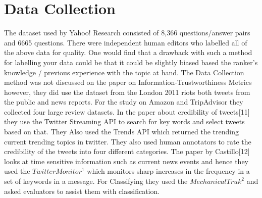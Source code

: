 \section{Data Collection}
The dataset used by Yahoo! Research consisted of 8,366 questions/answer pairs and 6665 questions. There were independent human editors who labelled all of the above data for quality. One would find that a drawback with such a method for labelling your data could be that it could be slightly biased based the ranker's knowledge / previous experience with the topic at hand. The Data Collection method was not discussed on the paper on Information-Trustworthiness Metrics however, they did use the dataset from the London 2011 riots both tweets from the public and news reports. For the study on Amazon and TripAdvisor they collected four large review datasets. In the paper about credibility of tweets[11] they use the Twitter Streaming API to search for key words and select tweets based on that. They Also used the Trends API which returned the trending current trending topics in twitter. They also used human annotators to rate the credibility of the tweets into four different categories. The paper by Castillo[12] looks at time sensitive information such as current news events and hence they used the $Twitter Monitor^1$ which monitors sharp increases in the frequency in a set of keywords in a message. For Classifying they used the $Mechanical Truk^2$ and asked evaluators to assist them with classification. 
